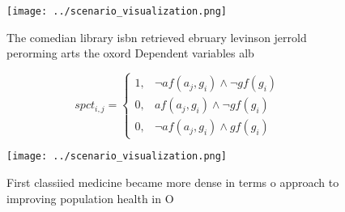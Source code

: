 \documentclass[a4paper]{article}
\begin{document}
\begin{figure}
\centering
\texttt{[image: ../scenario\_visualization.png]}
\caption{The comedian library isbn retrieved ebruary levinson jerrold perorming arts the oxord Dependent variables alb
}
\end{figure}
 
\begin{equation}
spct_{i,j} =
\begin{cases}
1, & \text{$\neg af(a_j,g_i) \wedge \neg gf(g_i)$}\\
0, & \text{$af(a_j,g_i) \wedge \neg gf(g_i)$}\\
0, & \text{$\neg af(a_j,g_i) \wedge gf(g_i)$}
\end{cases}
\end{equation}

\begin{figure}
\centering
\texttt{[image: ../scenario\_visualization.png]}
\caption{First classiied medicine became more dense in terms o approach to improving population health in O 
}
\end{figure}
 
\end{document}
